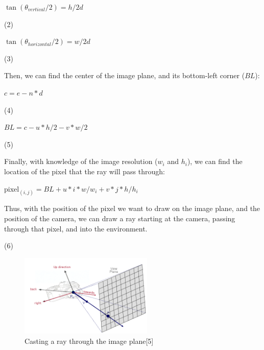 \documentclass[journal]{IEEEtran}
\begin{document}
\begin{center}
$\tan(\theta_{vertical}/2) = h / 2d$
\end{center}

\begin{flushright}
\par 
(2)
\end{flushright}

\begin{center}
$\tan(\theta_{horizontal}/2) =w / 2d$
\end{center}

\begin{flushright}
\par 
(3)
\end{flushright}

Then, we can find the center of the image plane, and its bottom-left corner ($BL$):

\begin{center}
$c = e - n * d$
\end{center}

\begin{flushright}
\par 
(4)
\end{flushright}

\begin{center}
$BL = c - u * h /2 - v *w/2$
\end{center}

\begin{flushright}
\par 
(5)
\end{flushright}

Finally, with knowledge of the image resolution ($w_{i}$ and $h_{i}$), we can find the location of the pixel that the ray will pass through:

\begin{center}
$\text{pixel}_{(i,j)}= BL + u * i * w / w_{i} + v * j * h/h_{i}$
\end{center}

Thus, with the position of the pixel we want to draw on the image plane, and the position of the camera, we can draw a ray starting at the camera, passing through that pixel, and into the environment.

\begin{flushright}
\par 
(6)
\end{flushright}


\begin{figure}[!t]

\centering
\includegraphics[width=2.5in]{raycast_viewplane}
\caption{Casting a ray through the image plane[5]}
\label{raycast_imageplane}

\end{figure}
\end{document}
